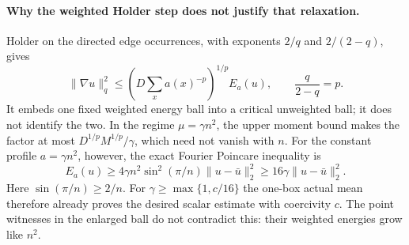 \documentclass[11pt]{article}
\begin{document}
\paragraph{Why the weighted Holder step does not justify that relaxation.}
Holder on the directed edge occurrences, with exponents $2/q$ and
$2/(2-q)$, gives
\[
 \|\nabla u\|_q^2\le
 \left(D\sum_x a(x)^{-p}\right)^{1/p} E_a(u),
 \qquad \frac{q}{2-q}=p.
\]
It embeds one fixed weighted energy ball into a critical unweighted ball;
it does not identify the two. In the regime $\mu=\gamma n^2$, the upper
moment bound makes the factor at most $D^{1/p}M^{1/p}/\gamma$, which need
not vanish with $n$. For the constant profile $a=\gamma n^2$, however,
the exact Fourier Poincare inequality is
\[
 E_a(u)\ge4\gamma n^2\sin^2(\pi/n)\|u-\bar u\|_2^2
 \ge16\gamma\|u-\bar u\|_2^2.
\]
Here $\sin(\pi/n)\ge2/n$. For $\gamma\ge\max\{1,c/16\}$ the one-box
actual mean therefore already proves the desired scalar estimate with
coercivity $c$. The point witnesses in the enlarged ball do not contradict
this: their weighted energies grow like $n^2$.
\end{document}
